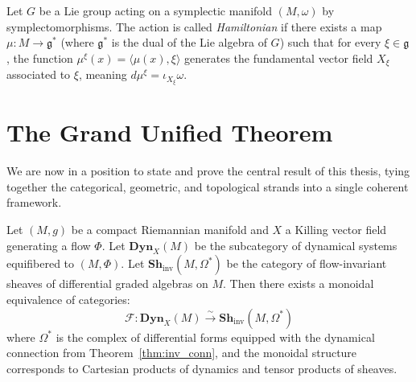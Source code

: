 \begin{definition}
Let $G$ be a Lie group acting on a symplectic manifold $(M, \omega)$ by symplectomorphisms. The action is called \emph{Hamiltonian} if there exists a map $\mu: M \to \mathfrak{g}^*$ (where $\mathfrak{g}^*$ is the dual of the Lie algebra of $G$) such that for every $\xi \in \mathfrak{g}$, the function $\mu^\xi(x) = \langle \mu(x), \xi \rangle$ generates the fundamental vector field $X_\xi$ associated to $\xi$, meaning $d\mu^\xi = \iota_{X_\xi} \omega$.
\end{definition}

\section{The Grand Unified Theorem}
\label{sec:gut}

We are now in a position to state and prove the central result of this thesis, tying together the categorical, geometric, and topological strands into a single coherent framework.

\begin{theorem}
\label{thm:gut}
Let $(M, g)$ be a compact Riemannian manifold and $X$ a Killing vector field generating a flow $\Phi$. Let $\mathbf{Dyn}_X(M)$ be the subcategory of dynamical systems equifibered to $(M, \Phi)$. Let $\mathbf{Sh}_{\text{inv}}(M, \Omega^*)$ be the category of flow-invariant sheaves of differential graded algebras on $M$. Then there exists a monoidal equivalence of categories:
\[ \mathcal{F}: \mathbf{Dyn}_X(M) \xrightarrow{\sim} \mathbf{Sh}_{\text{inv}}(M, \Omega^*) \]
where $\Omega^*$ is the complex of differential forms equipped with the dynamical connection from Theorem~\ref{thm:inv_conn}, and the monoidal structure corresponds to Cartesian products of dynamics and tensor products of sheaves.
\end{theorem}

